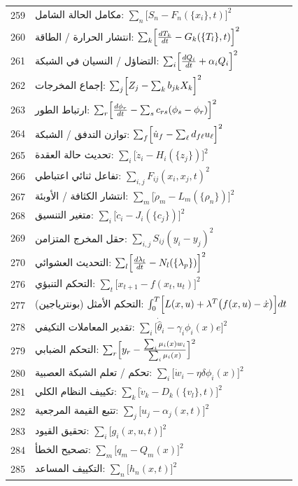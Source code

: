 \documentclass[11pt,a4paper]{article}
\begin{document}
\begin{longtable}{r l}
		259 & مكامل الحالة الشامل: $\sum_n\bigl[S_n - F_n(\{x_i\},t)\bigr]^2$ \\
		260 & انتشار الحرارة / الطاقة: $\sum_k\Bigl[\frac{dT_k}{dt} - G_k(\{T_l\},t)\Bigr]^2$ \\
		261 & التضاؤل / النسيان في الشبكة: $\sum_i\Bigl[\frac{dQ_i}{dt} + \alpha_i Q_i\Bigr]^2$ \\
		262 & إجماع المخرجات: $\sum_j\Bigl[Z_j - \sum_k b_{jk}X_k\Bigr]^2$ \\
		263 & ارتباط الطور: $\sum_r\Bigl[\frac{d\phi_r}{dt} - \sum_s c_{rs}(\phi_s-\phi_r)\Bigr]^2$ \\
		264 & توازن التدفق / الشبكة: $\sum_f\Bigl[\dot u_f - \sum_\ell d_{f\ell}u_\ell\Bigr]^2$ \\
		265 & تحديث حالة العقدة: $\sum_i\bigl[\dot z_i - H_i(\{z_j\})\bigr]^2$ \\
		266 & تفاعل ثنائي اعتباطي: $\sum_{i,j}F_{ij}(x_i,x_j,t)^2$ \\
		267 & انتشار الكثافة / الأوبئة: $\sum_m\bigl[\dot\rho_m - L_m(\{\rho_n\})\bigr]^2$ \\
		268 & متغير التنسيق: $\sum_i\bigl[\dot c_i - J_i(\{c_j\})\bigr]^2$ \\
		269 & حقل المخرج المتزامن: $\sum_{i,j}S_{ij}(y_i-y_j)^2$ \\
		270 & التحديث العشوائي: $\sum_l\Bigl[\frac{d\lambda_l}{dt} - N_l(\{\lambda_p\})\Bigr]^2$ \\
		276 & التحكم التنبؤي: $\sum_t\bigl[x_{t+1} - f(x_t,u_t)\bigr]^2$ \\
		277 & التحكم الأمثل (بونترياجين): $\int_0^T\Bigl[L(x,u) + \lambda^T\bigl(f(x,u)-\dot x\bigr)\Bigr]dt$ \\
		278 & تقدير المعاملات التكيفي: $\sum_i\bigl[\dot{\hat\theta}_i - \gamma_i\phi_i(x)e\bigr]^2$ \\
		279 & التحكم الضبابي: $\sum_r\Bigl[y_r - \frac{\sum_i\mu_i(x)w_i}{\sum_i\mu_i(x)}\Bigr]^2$ \\
		280 & تحكم / تعلم الشبكة العصبية: $\sum_i\bigl[\dot w_i - \eta\delta\phi_i(x)\bigr]^2$ \\
		281 & تكييف النظام الكلي: $\sum_k\bigl[\dot v_k - D_k(\{v_l\},t)\Bigr]^2$ \\
		282 & تتبع القيمة المرجعية: $\sum_j\bigl[u_j - \alpha_j(x,t)\Bigr]^2$ \\
		283 & تحقيق القيود: $\sum_i\bigl[g_i(x,u,t)\bigr]^2$ \\
		284 & تصحيح الخطأ: $\sum_m\bigl[q_m - Q_m(x)\bigr]^2$ \\
		285 & التكييف المساعد: $\sum_n\bigl[h_n(x,t)\bigr]^2$ \\

\end{longtable}
\end{document}
